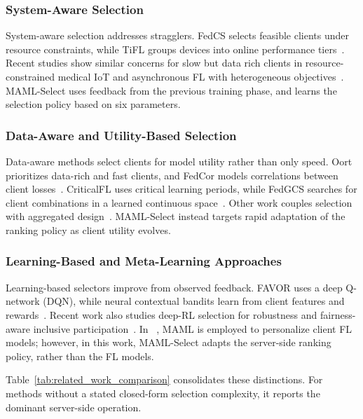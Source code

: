 \documentclass[journal]{IEEEtran}
\newcommand{\revision}[1]{#1}
\begin{document}
\subsubsection{System-Aware Selection}
System-aware selection addresses stragglers. FedCS selects feasible clients under resource constraints, while TiFL groups devices into online performance tiers~\cite{nishio2019client,chai2020tifl}. Recent studies show similar concerns for slow but data rich clients in resource-constrained medical IoT and asynchronous FL with heterogeneous objectives~\cite{tapwal2026stragglers,forootani2026asynchronous}. MAML-Select uses feedback from the previous training phase, and learns the selection policy based on six parameters. %

\subsubsection{Data-Aware and Utility-Based Selection}
Data-aware methods select clients for model utility rather than only speed. Oort prioritizes data-rich and fast clients, and FedCor models correlations between client losses~\cite{lai2021oort,tang2022fedcor}. CriticalFL uses critical learning periods, while FedGCS searches for client combinations in a learned continuous space~\cite{yan2023criticalfl,ning2024fedgcs}. Other work couples selection with aggregated design~\cite{xu2024federated,tran2026fedimp}. MAML-Select instead targets rapid adaptation of the ranking policy as client utility evolves.

\subsubsection{Learning-Based and Meta-Learning Approaches}
Learning-based selectors improve from observed feedback. FAVOR uses a deep Q-network (DQN), while neural contextual bandits learn from client features and rewards~\cite{wang2020optimizing,pan2024contextual}. Recent work also studies deep-RL selection for robustness and fairness-aware inclusive participation~\cite{kazemi2026robust,arisdakessian2026vox}. In ~\cite{fallah2020personalized}, MAML is employed to personalize client FL models; however, in this work, MAML-Select adapts the server-side ranking policy, rather than the FL models.

\revision{Table~\ref{tab:related_work_comparison} consolidates these distinctions. For methods without a stated closed-form selection complexity, it reports the dominant server-side operation.}
\end{document}
